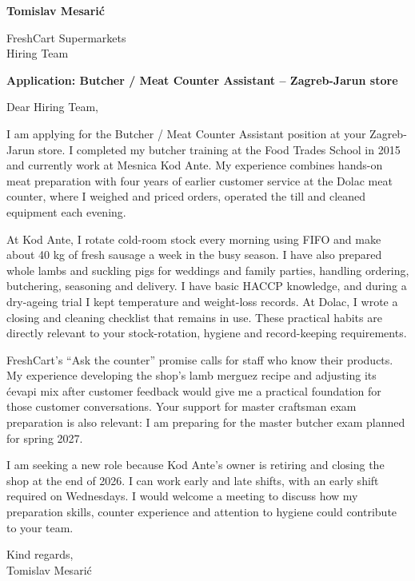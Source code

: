 \documentclass[11pt,a4paper]{article}
\begin{document}
{\Large\bfseries\color{primarycolor} Tomislav Mesarić}

FreshCart Supermarkets\\
Hiring Team

\textbf{Application: Butcher / Meat Counter Assistant – Zagreb-Jarun store}

Dear Hiring Team,

I am applying for the Butcher / Meat Counter Assistant position at your Zagreb-Jarun store. I completed my butcher training at the Food Trades School in 2015 and currently work at Mesnica Kod Ante. My experience combines hands-on meat preparation with four years of earlier customer service at the Dolac meat counter, where I weighed and priced orders, operated the till and cleaned equipment each evening.

At Kod Ante, I rotate cold-room stock every morning using FIFO and make about 40 kg of fresh sausage a week in the busy season. I have also prepared whole lambs and suckling pigs for weddings and family parties, handling ordering, butchering, seasoning and delivery. I have basic HACCP knowledge, and during a dry-ageing trial I kept temperature and weight-loss records. At Dolac, I wrote a closing and cleaning checklist that remains in use. These practical habits are directly relevant to your stock-rotation, hygiene and record-keeping requirements.

FreshCart's ``Ask the counter'' promise calls for staff who know their products. My experience developing the shop's lamb merguez recipe and adjusting its ćevapi mix after customer feedback would give me a practical foundation for those customer conversations. Your support for master craftsman exam preparation is also relevant: I am preparing for the master butcher exam planned for spring 2027.

I am seeking a new role because Kod Ante's owner is retiring and closing the shop at the end of 2026. I can work early and late shifts, with an early shift required on Wednesdays. I would welcome a meeting to discuss how my preparation skills, counter experience and attention to hygiene could contribute to your team.

Kind regards,\\
Tomislav Mesarić
\end{document}
